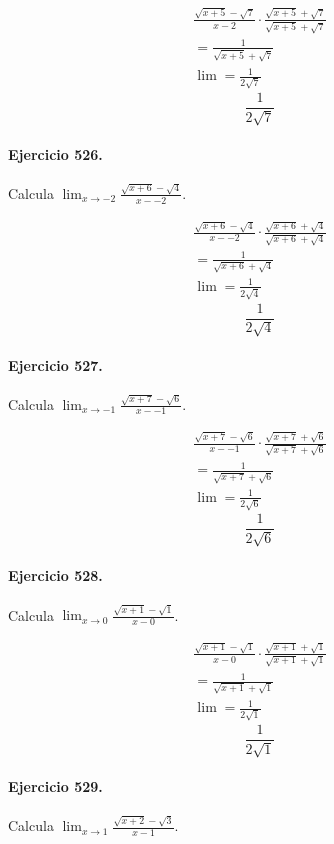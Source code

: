 \documentclass[11pt,a4paper]{article}
\begin{document}
\[
\begin{aligned}
\frac{\sqrt{x+5}-\sqrt{7}}{x-2}\cdot \frac{\sqrt{x+5}+\sqrt{7}}{\sqrt{x+5}+\sqrt{7}}\\
=\frac{1}{\sqrt{x+5}+\sqrt{7}}\\
\lim=\frac{1}{2\sqrt{7}}
\end{aligned}
\]
\[\boxed{\frac{1}{2\sqrt{7}}}\]


\paragraph{Ejercicio 526.} Calcula $\displaystyle\lim_{x\to -2}\frac{\sqrt{x+6}-\sqrt{4}}{x--2}$.

\[
\begin{aligned}
\frac{\sqrt{x+6}-\sqrt{4}}{x--2}\cdot \frac{\sqrt{x+6}+\sqrt{4}}{\sqrt{x+6}+\sqrt{4}}\\
=\frac{1}{\sqrt{x+6}+\sqrt{4}}\\
\lim=\frac{1}{2\sqrt{4}}
\end{aligned}
\]
\[\boxed{\frac{1}{2\sqrt{4}}}\]


\paragraph{Ejercicio 527.} Calcula $\displaystyle\lim_{x\to -1}\frac{\sqrt{x+7}-\sqrt{6}}{x--1}$.

\[
\begin{aligned}
\frac{\sqrt{x+7}-\sqrt{6}}{x--1}\cdot \frac{\sqrt{x+7}+\sqrt{6}}{\sqrt{x+7}+\sqrt{6}}\\
=\frac{1}{\sqrt{x+7}+\sqrt{6}}\\
\lim=\frac{1}{2\sqrt{6}}
\end{aligned}
\]
\[\boxed{\frac{1}{2\sqrt{6}}}\]


\paragraph{Ejercicio 528.} Calcula $\displaystyle\lim_{x\to 0}\frac{\sqrt{x+1}-\sqrt{1}}{x-0}$.

\[
\begin{aligned}
\frac{\sqrt{x+1}-\sqrt{1}}{x-0}\cdot \frac{\sqrt{x+1}+\sqrt{1}}{\sqrt{x+1}+\sqrt{1}}\\
=\frac{1}{\sqrt{x+1}+\sqrt{1}}\\
\lim=\frac{1}{2\sqrt{1}}
\end{aligned}
\]
\[\boxed{\frac{1}{2\sqrt{1}}}\]


\paragraph{Ejercicio 529.} Calcula $\displaystyle\lim_{x\to 1}\frac{\sqrt{x+2}-\sqrt{3}}{x-1}$.
\end{document}

